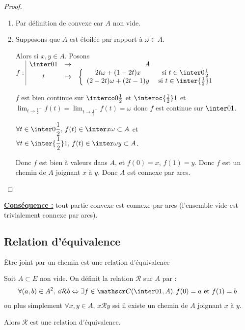 \begin{proof}~
    \begin{enumerate}
        \item Par définition de convexe car $A$ non vide. 

        \item Supposons que $A$ est étoilée par rapport à $\omega \in A$.

        Alors si $x, y \in A$. Posons $f: \space \begin{array}{|ccc}
        \inter 0 1 & \to & A \\
        t & \mapsto & \left\{ \begin{array}{cc}
            2t \omega + (1 - 2t)x & \text{ si } t \in \inter 0 {\frac 1 2} \\
            (2 - 2t) \omega + (2t - 1)y & \text{ si } t \in \inter {\frac 1 2} 1        
        \end{array} \right.
        \end{array}$

        $f$ est bien continue sur $\interco 0 {\frac 1 2}$ et $\interoc {\frac 1 2} 1$ et 
        $\displaystyle \lim_{t \to \frac 1 2^-} f(t) = \lim_{t \to \frac 1 2^+} f(t) = \omega$ donc $f$ est continue sur $\inter 0 1$.

        $\displaystyle \forall t \in \inter 0 {\frac 1 2}, \, f(t) \in \inter x \omega \subset A$ et
        $\displaystyle \forall t \in \inter {\frac 1 2} 1, \, f(t) \in \inter \omega y \subset A$.

        Donc $f$ est bien à valeurs dans $A$, et $f(0) = x$, $f(1) = y$. 
        Donc $f$ est un chemin de $A$ joignant $x$ à $y$. Donc $A$ est connexe par arcs.
    \end{enumerate}
\end{proof}

\textbf{\uline{Conséquence :}} tout partie convexe est connexe par arcs (l'ensemble vide est trivialement connexe par arcs).

\subsection{Relation d'équivalence}

\begin{theoreme}{Être joint par un chemin est une relation d'équivalence}{}

    Soit $A \subset E$ non vide.
    On définit la relation $\mathcal R$ sur $A$ par : 
    \[\forall (a, b) \in A^2, \, a \mathcal R b \Leftrightarrow \exists f \in \mathscr C(\inter 0 1, A), f(0) = a \text{ et } f(1) = b\]
    ou plus simplement $\forall x, y \in A, \, x \mathcal R y$ ssi il existe un chemin de $A$ joignant $x$ à $y$.
    
    Alors $\mathcal R$ est une relation d'équivalence.
\end{theoreme}

